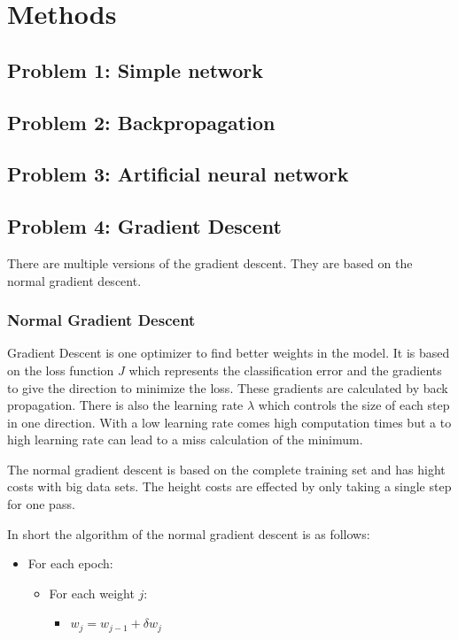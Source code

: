 \chapter{Methods}
\section{Problem 1: Simple network}
\section{Problem 2: Backpropagation}
\section{Problem 3: Artificial neural network}
\section{Problem 4: Gradient Descent}\label{ch:methods:sec:4}

There are multiple versions of the gradient descent.
They are based on the normal gradient descent.

\subsection{Normal Gradient Descent}

Gradient Descent is one optimizer to find better weights in the model.
It is based on the loss function $J$ which represents the classification error and the gradients to give the direction to minimize the loss.
These gradients are calculated by back propagation.
There is also the learning rate $\lambda$ which controls the size of each step in one direction.
With a low learning rate comes high computation times but a to high learning rate can lead to a miss calculation of the minimum.

The normal gradient descent is based on the complete training set and has hight costs with big data sets.
The height costs are effected by only taking a single step for one pass.

In short the algorithm of the normal gradient descent is as follows:

\begin{itemize}
	\item For each epoch:
	\begin{itemize}
		\item For each weight $j$:
		\begin{itemize}
            \item $w_j = w_{j-1} + \delta{w_j}$
		\end{itemize}
	\end{itemize}
\end{itemize}

